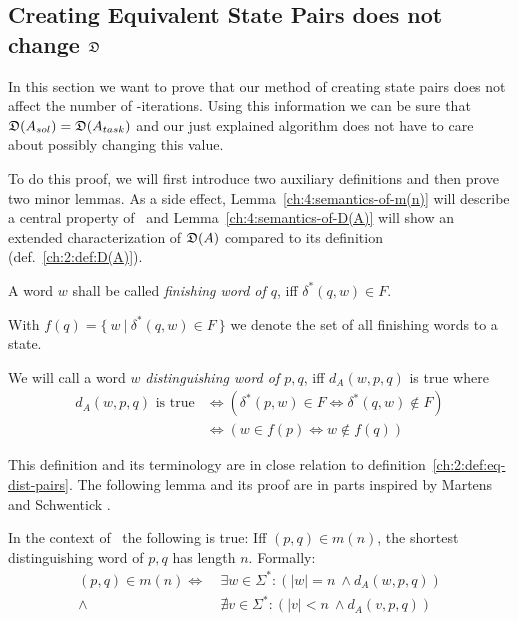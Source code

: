 \subsection{Creating Equivalent State Pairs does not change $\mathfrak{D}$} \label{ch:4:sec-D-proof}

In this section we want to prove that our method of creating state pairs does not affect the number of \CompDist-iterations. Using this information we can be sure that $\mathfrak{D}(A_{sol}) = \mathfrak{D}(A_{task})$ and our just explained algorithm does not have to care about possibly changing this value.

To do this proof, we will first introduce two auxiliary definitions and then prove two minor lemmas. As a side effect, Lemma~\ref{ch:4:semantics-of-m(n)} will describe a central property of \CompDist\ and Lemma~\ref{ch:4:semantics-of-D(A)} will show an extended characterization of $\mathfrak{D}(A)$ compared to its definition (def.~\ref{ch:2:def:D(A)}).

A word $w$ shall be called \emph{finishing word of $q$}, iff $\delta^*(q, w) \in F$.

With $f(q) = \{\ w\ |\ \delta^*(q, w) \in F\ \}$ we denote the set of all finishing words to a state.
\begin{definition} \label{ch:4:def-dist-word}
	We will call a word $w$ \emph{distinguishing word of $p,q$}, iff $d_A(w, p, q)$ is true where
	\begin{align*}
	d_A(w, p, q) \text{ is true} &\Leftrightarrow (\delta^*(p,w) \in F \Leftrightarrow \delta^*(q,w) \notin F) \\
	&\Leftrightarrow (w \in f(p) \Leftrightarrow w \notin f(q))
	\end{align*}
\end{definition}
\noindent This definition and its terminology are in close relation to definition~\ref{ch:2:def:eq-dist-pairs}. The following lemma and its proof are in parts inspired by Martens and Schwentick \cite[ch.\ 4 p.\ 18]{MS18}.

\begin{lemma}\label{ch:4:semantics-of-m(n)}
    In the context of \CompDist\ the following is true: Iff $(p,q)\in m(n)$, the shortest distinguishing word of $p,q$ has length $n$. Formally:
    \begin{align*}
        (p,q) \in m(n) \Longleftrightarrow\ &\exists w\in\Sigma^*\colon (|w| = n\ \land d_A(w, p, q))\\
        \land\ &\nexists v\in\Sigma^*\colon (|v| < n\ \land d_A(v, p, q))
    \end{align*}
\end{lemma}

